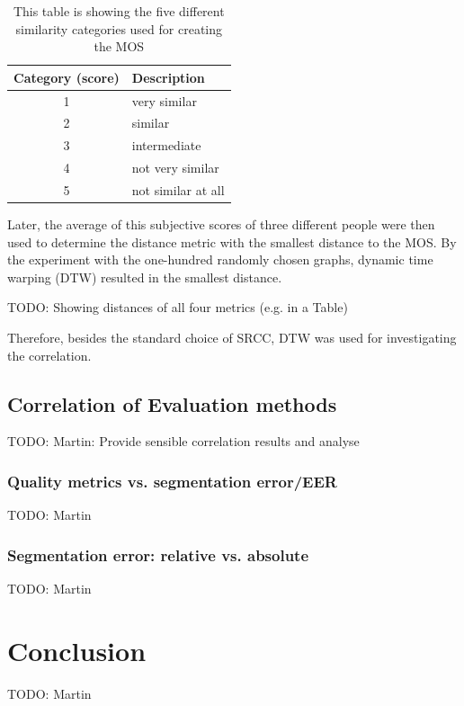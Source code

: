 \documentclass[10pt,twocolumn,letterpaper]{article}
\begin{document}
\begin{table}[ht]
\newcommand\T{\rule{0pt}{3.2ex}}
\newcommand\B{\rule[-1.8ex]{0pt}{0pt}}
\begin{center}
\begin{tabular}{| c | l |}
  \hline
  {\bf Category (score)} \T \B & {\bf Description} \\
  \hline
  1 & very similar \\
  \hline
  2 & similar \\
  \hline
  3 & intermediate \\
  \hline
  4 & not very similar \\
  \hline
  5 & not similar at all \\
  \hline
\end{tabular}
\end{center}
\caption{This table is showing the five different similarity categories used for creating the MOS}
\label{tab:resultsMOS}
\end{table}

Later, the average of this subjective scores of three different people %
were then used to determine the distance metric with the smallest distance to the MOS. By the experiment with the one-hundred randomly chosen graphs, dynamic time warping (DTW) resulted in the smallest distance. 

TODO: Showing distances of all four metrics (e.g. in a Table)

Therefore, besides the standard choice of SRCC, DTW was used for investigating the correlation. 


\subsection{Correlation of Evaluation methods}
TODO: Martin:
Provide sensible correlation results and analyse

\subsubsection{Quality metrics vs. segmentation error/EER}
TODO: Martin

\subsubsection{Segmentation error: relative vs. absolute}
TODO: Martin


\section{Conclusion}
\label{section:conclusion}
TODO: Martin 


{\small


}
\end{document}
